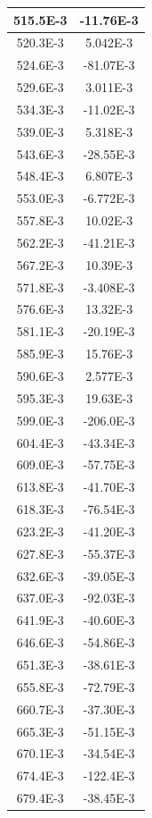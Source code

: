 \documentclass[english, 12pt, a4paper]{ifimaster}
\begin{document}
\begin{appendices}
\begin{center}
\begin{longtable}[htbp]{|c|c|}
\hline
  515.5E-3 & -11.76E-3 \\
\hline
  520.3E-3 & 5.042E-3 \\
\hline
  524.6E-3 & -81.07E-3 \\
\hline
  529.6E-3 & 3.011E-3 \\
\hline
  534.3E-3 & -11.02E-3 \\
\hline
  539.0E-3 & 5.318E-3 \\
\hline
  543.6E-3 & -28.55E-3 \\
\hline
  548.4E-3 & 6.807E-3 \\
\hline
  553.0E-3 & -6.772E-3 \\
\hline
  557.8E-3 & 10.02E-3 \\
\hline
  562.2E-3 & -41.21E-3 \\
\hline
  567.2E-3 & 10.39E-3 \\
\hline
  571.8E-3 & -3.408E-3 \\
\hline
  576.6E-3 & 13.32E-3 \\
\hline
  581.1E-3 & -20.19E-3 \\
\hline
  585.9E-3 & 15.76E-3 \\
\hline
  590.6E-3 & 2.577E-3 \\
\hline
  595.3E-3 & 19.63E-3 \\
\hline
  599.0E-3 & -206.0E-3 \\
\hline
  604.4E-3 & -43.34E-3 \\
\hline
  609.0E-3 & -57.75E-3 \\
\hline
  613.8E-3 & -41.70E-3 \\
\hline
  618.3E-3 & -76.54E-3 \\
\hline
  623.2E-3 & -41.20E-3 \\
\hline
  627.8E-3 & -55.37E-3 \\
\hline
  632.6E-3 & -39.05E-3 \\
\hline
  637.0E-3 & -92.03E-3 \\
\hline
  641.9E-3 & -40.60E-3 \\
\hline
  646.6E-3 & -54.86E-3 \\
\hline
  651.3E-3 & -38.61E-3 \\
\hline
  655.8E-3 & -72.79E-3 \\
\hline
  660.7E-3 & -37.30E-3 \\
\hline
  665.3E-3 & -51.15E-3 \\
\hline
  670.1E-3 & -34.54E-3 \\
\hline
  674.4E-3 & -122.4E-3 \\
\hline
  679.4E-3 & -38.45E-3 \\

\end{longtable}
\end{center}
\end{appendices}
\end{document}
